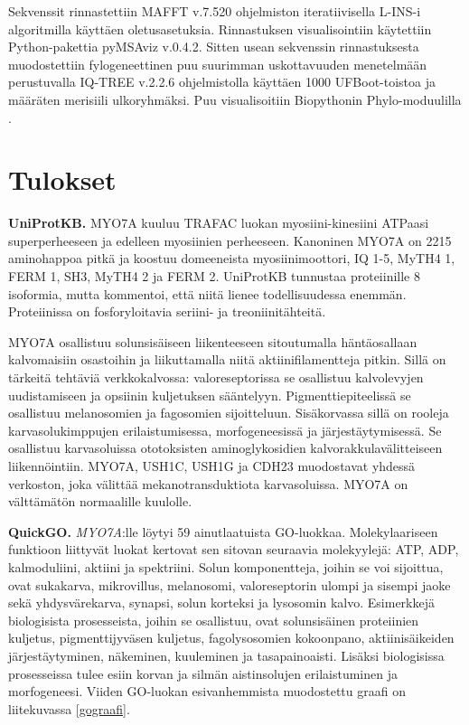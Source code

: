 \documentclass[a4paper,11pt,notitlepage]{article}
\begin{document}
Sekvenssit rinnastettiin MAFFT v.7.520 \cite{mafftv7} ohjelmiston iteratiivisella L-INS-i algoritmilla käyttäen oletusasetuksia. Rinnastuksen visualisointiin käytettiin Python-pakettia pyMSAviz v.0.4.2. Sitten usean sekvenssin rinnastuksesta muodostettiin fylogeneettinen puu suurimman uskottavuuden menetelmään perustuvalla IQ-TREE v.2.2.6 \cite{iqtree} ohjelmistolla käyttäen 1000 UFBoot-toistoa ja määräten merisiili ulkoryhmäksi. Puu visualisoitiin Biopythonin Phylo-moduulilla \cite{phylo}.


\section{Tulokset}
\textbf{UniProtKB.} MYO7A kuuluu TRAFAC luokan myosiini-kinesiini ATPaasi superperheeseen ja edelleen myosiinien perheeseen. Kanoninen MYO7A on 2215 aminohappoa pitkä ja koostuu domeeneista myosiinimoottori, IQ 1-5, MyTH4 1, FERM 1, SH3, MyTH4 2 ja FERM 2. UniProtKB tunnustaa proteiinille 8 isoformia, mutta kommentoi, että niitä lienee todellisuudessa enemmän. Proteiinissa on fosforyloitavia seriini- ja treoniinitähteitä.

MYO7A osallistuu solunsisäiseen liikenteeseen sitoutumalla häntäosallaan kalvomaisiin osastoihin ja liikuttamalla niitä aktiinifilamentteja pitkin. Sillä on tärkeitä tehtäviä verkkokalvossa: valoreseptorissa se osallistuu kalvolevyjen uudistamiseen ja opsiinin kuljetuksen sääntelyyn. Pigmenttiepiteelissä se osallistuu melanosomien ja fagosomien sijoitteluun. Sisäkorvassa sillä on rooleja karvasolukimppujen erilaistumisessa, morfogeneesissä ja järjestäy\-tymisessä. Se osallistuu karvasoluissa ototoksisten aminoglykosidien kalvorakkulavälitteiseen liikennöintiin. MYO7A, USH1C, USH1G ja CDH23 muodostavat yhdessä verkoston, joka välittää mekanotransduktiota karvasoluissa. MYO7A on välttämätön normaalille kuulolle.

\textbf{QuickGO.} \textit{MYO7A}:lle löytyi 59 ainutlaatuista GO-luokkaa. Molekylaariseen funktioon liittyvät luokat kertovat sen sitovan seuraavia molekyylejä: ATP, ADP, kalmoduliini, aktiini ja spektriini. Solun komponentteja, joihin se voi sijoittua, ovat sukakarva, mikrovillus, melanosomi, valoreseptorin ulompi ja sisempi jaoke sekä yhdysvärekarva, synapsi, solun korteksi ja lysosomin kalvo. Esimerkkejä biologisista prosesseista, joihin se osallistuu, ovat solunsisäinen proteiinien kuljetus, pigmenttijyväsen kuljetus, fagolysosomien kokoonpano, aktiinisäikeiden järjestäytyminen, näkeminen, kuuleminen ja tasapainoaisti. Lisäksi biologisissa prosesseissa tulee esiin korvan ja silmän aistinsolujen erilaistuminen ja morfogeneesi. Viiden GO-luokan esivanhemmista muodostettu graafi on liitekuvassa \ref{gograafi}.
\end{document}
